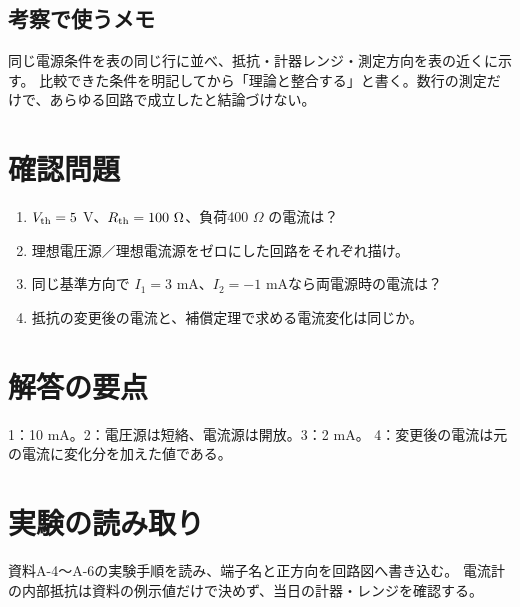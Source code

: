 \documentclass[lualatex,a4paper,10pt]{jlreq}
\begin{document}
\subsection{考察で使うメモ}
同じ電源条件を表の同じ行に並べ、抵抗・計器レンジ・測定方向を表の近くに示す。
比較できた条件を明記してから「理論と整合する」と書く。数行の測定だけで、あらゆる回路で成立したと結論づけない。

\clearpage
\clearpage
\section{確認問題}\label{sec:auto8}
\begin{enumerate}
\item $V_{\rm th}=5$ V、$R_{\rm th}=100\ \Omega$、負荷400 $\Omega$ の電流は？\answerline
\item 理想電圧源／理想電流源をゼロにした回路をそれぞれ描け。\answerline
\item 同じ基準方向で $I_1=3$ mA、$I_2=-1$ mAなら両電源時の電流は？\answerline
\item 抵抗の変更後の電流と、補償定理で求める電流変化は同じか。\answerline
\end{enumerate}
\section*{解答の要点}\label{sec:auto9}
1：10 mA。2：電圧源は短絡、電流源は開放。3：2 mA。
4：変更後の電流は元の電流に変化分を加えた値である。
\section*{実験の読み取り}\label{sec:auto10}
資料A-4〜A-6の実験手順を読み、端子名と正方向を回路図へ書き込む。
電流計の内部抵抗は資料の例示値だけで決めず、当日の計器・レンジを確認する。
\prelabclosing
\end{document}
